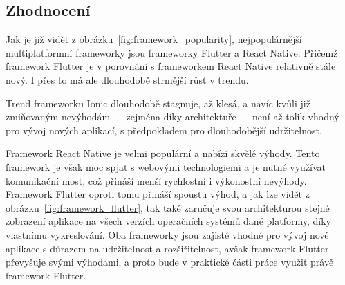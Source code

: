 \subsection{Zhodnocení}

Jak je již vidět z obrázku~\ref{fig:framework_popularity},
nejpopulárnější multiplatformní frameworky jsou frameworky Flutter a
React Native.
Přičemž framework Flutter je v porovnání s frameworkem React Native relativně
stále nový.
I přes to má ale dlouhodobě strmější růst v trendu.

Trend frameworku Ionic dlouhodobě stagnuje, až klesá,
a navíc kvůli již zmiňovaným nevýhodám
--- zejména díky architektuře ---
není až tolik vhodný pro vývoj nových aplikací,
s předpokladem pro dlouhodobější udržitelnost. 

Framework React Native je velmi populární a nabízí skvělé výhody.
Tento framework je však moc spjat s webovými technologiemi
a je nutné využívat komunikační most,
což přináší menší rychlostní i výkonostní nevýhody.
Framework Flutter oproti tomu přináší spoustu výhod,
a jak lze vidět z obrázku~\ref{fig:framework_flutter},
tak také zaručuje svou architekturou stejné zobrazení aplikace na všech
verzích operačních systémů dané platformy,
díky vlastnímu vykreslování.
Oba frameworky jsou zajisté vhodné pro vývoj nové aplikace s důrazem na
udržitelnost a rozšiřitelnost,
avšak framework Flutter převyšuje svými výhodami,
a proto bude v praktické části práce využit právě framework Flutter.
